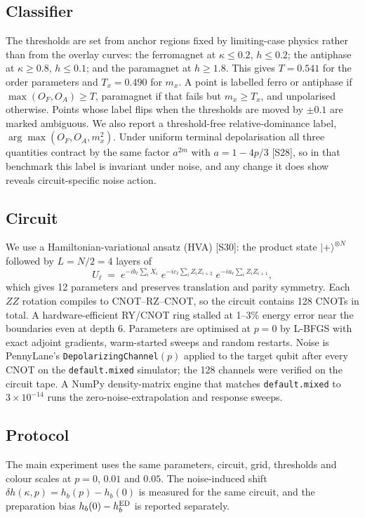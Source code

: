 \documentclass[10pt,twocolumn]{article}
\begin{document}
\subsection{Classifier}
The thresholds are set from anchor regions fixed by limiting-case physics rather than from the overlay curves: the ferromagnet at $\kappa\le0.2$, $h\le0.2$; the antiphase at $\kappa\ge0.8$, $h\le0.1$; and the paramagnet at $h\ge1.8$. This gives $T=0.541$ for the order parameters and $T_x=0.490$ for $m_x$. A point is labelled ferro or antiphase if $\max(O_F,O_A)\ge T$, paramagnet if that fails but $m_x\ge T_x$, and unpolarised otherwise. Points whose label flips when the thresholds are moved by $\pm0.1$ are marked ambiguous. We also report a threshold-free relative-dominance label, $\arg\max(O_F,O_A,m_x^2)$. Under uniform terminal depolarisation all three quantities contract by the same factor $a^{2m}$ with $a=1-4p/3$ [S28], so in that benchmark this label is invariant under noise, and any change it does show reveals circuit-specific noise action.

\subsection{Circuit}
We use a Hamiltonian-variational ansatz (HVA) [S30]: the product state $|+\rangle^{\otimes N}$ followed by $L=N/2=4$ layers of
\begin{equation}
U_\ell \;=\; e^{-i b_\ell \sum_i X_i}\; e^{-i c_\ell \sum_i Z_iZ_{i+2}}\; e^{-i a_\ell \sum_i Z_iZ_{i+1}} ,
\end{equation}
which gives 12 parameters and preserves translation and parity symmetry. Each $ZZ$ rotation compiles to CNOT--RZ--CNOT, so the circuit contains 128 CNOTs in total. A hardware-efficient RY/CNOT ring stalled at 1--3\% energy error near the boundaries even at depth 6. Parameters are optimised at $p=0$ by L-BFGS with exact adjoint gradients, warm-started sweeps and random restarts. Noise is PennyLane's \texttt{DepolarizingChannel}$(p)$ applied to the target qubit after every CNOT on the \texttt{default.mixed} simulator; the 128 channels were verified on the circuit tape. A NumPy density-matrix engine that matches \texttt{default.mixed} to $3\times10^{-14}$ runs the zero-noise-extrapolation and response sweeps.

\subsection{Protocol}
The main experiment uses the same parameters, circuit, grid, thresholds and colour scales at $p=0$, $0.01$ and $0.05$. The noise-induced shift $\delta h(\kappa,p)=h_b(p)-h_b(0)$ is measured for the same circuit, and the preparation bias $h_b(0)-h_b^{\rm ED}$ is reported separately.
\end{document}

